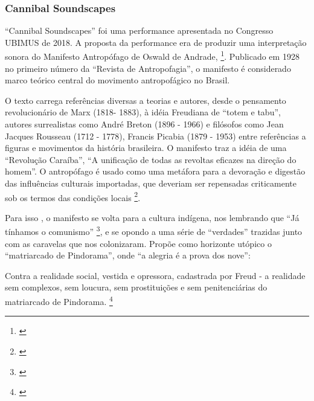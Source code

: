 \subsubsection{Cannibal Soundscapes}
``Cannibal Soundscapes'' foi uma performance apresentada no Congresso UBIMUS de 2018. A proposta da performance era de produzir uma interpretação sonora do Manifesto Antropófago de Oswald de Andrade, \footnote{\cite{Andrade1928}}. Publicado em 1928 no primeiro número da ``Revista de Antropofagia'', o manifesto é considerado  marco teórico central do movimento antropofágico no Brasil.

O texto carrega referências diversas a teorias e autores, desde o pensamento revolucionário de Marx (1818- 1883), à idéia Freudiana de ``totem e tabu'', autores surrealistas como André Breton (1896 - 1966) e filósofos como Jean Jacques Rousseau (1712 - 1778), Francis Picabia (1879 - 1953) entre referências a figuras e movimentos da história brasileira. O manifesto traz a idéia de uma ``Revolução Caraíba'', ``A unificação de todas as revoltas eficazes na direção do homem''. O antropófago é usado como uma metáfora para a devoração e digestão das influências culturais importadas, que deveriam ser repensadas criticamente sob os termos das condições locais \footnote{\cite{Berg-1999}}.

Para isso , o manifesto se volta para a cultura indígena, nos lembrando que ``Já tínhamos o comunismo'' \footnote{\cite{Bradley2007}}, e se opondo a uma série de ``verdades'' trazidas junto com as caravelas que nos colonizaram. Propõe como horizonte utópico o ``matriarcado de Pindorama'', onde ``a alegria é a prova dos nove'':

\begin{citacao}
Contra a realidade social, vestida e opressora, cadastrada por Freud - a realidade sem complexos, sem loucura, sem prostituições e sem penitenciárias do matriarcado de Pindorama. \footnote{\cite{Andrade1928}}
\end{citacao}

